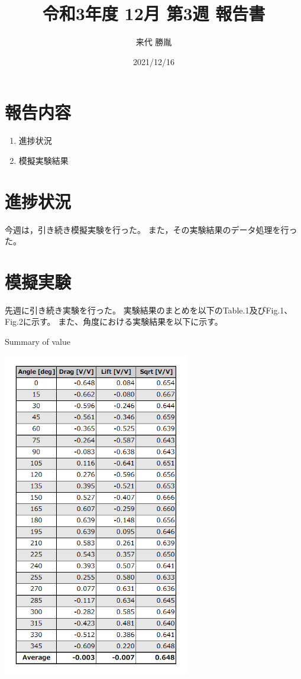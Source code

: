 \documentclass[twocolumn,a4j]{jsarticle}
\author{来代 勝胤}
\title{令和3年度 12月 第3週 報告書}
\date{2021/12/16}
\begin{document}
\columnseprule=0.1mm

\maketitle
\section*{報告内容}
\begin{enumerate}[1.]
    \item 進捗状況
    \item 模擬実験結果
\end{enumerate}

\section{進捗状況}
今週は，引き続き模擬実験を行った。
また，その実験結果のデータ処理を行った。

\section{模擬実験}

先週に引き続き実験を行った。
実験結果のまとめを以下のTable.1及びFig.1、Fig.2に示す。
また、角度における実験結果を以下に示す。

\begin{table}[htbp]
    \begin{center}
        \caption{Summary of value}
        \includegraphics[width=82mm]{../images/table_1.png}
    \end{center}
\end{table}
\end{document}
